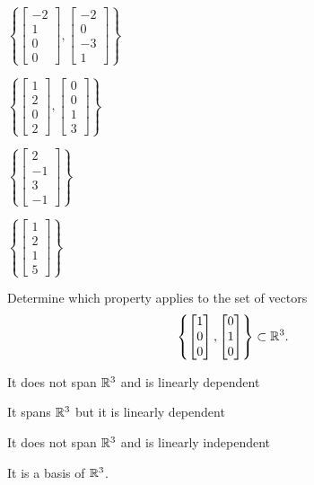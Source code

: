 \begin{readinessAssuranceTest}
\begin{multicols}{4}
\begin{readinessAssuranceTestChoices}
\item $\left\{ \begin{bmatrix} -2 \\ 1 \\ 0 \\ 0 \end{bmatrix}, \begin{bmatrix} -2 \\ 0 \\ -3 \\ 1 \end{bmatrix} \right\}$%
\item $\left\{ \begin{bmatrix} 1 \\ 2 \\ 0 \\ 2 \end{bmatrix}, \begin{bmatrix} 0 \\ 0 \\ 1 \\ 3 \end{bmatrix} \right\}$
\item $\left\{ \begin{bmatrix} 2 \\ -1 \\ 3 \\ -1 \end{bmatrix} \right\}$
\item $\left\{ \begin{bmatrix} 1 \\ 2 \\ 1 \\ 5 \end{bmatrix} \right\}$
\end{readinessAssuranceTestChoices}
\end{multicols}


\item Determine which property applies to the set of vectors $$\left\{ \begin{bmatrix}  1 \\ 0 \\ 0 \end{bmatrix}, \begin{bmatrix} 0 \\ 1 \\ 0 \end{bmatrix} \right\} \subset \mathbb{R}^3.$$
\begin{readinessAssuranceTestChoices}
\item It does not span \(\mathbb{R}^3\) and is linearly dependent
\item It spans \(\mathbb{R}^3\) but it is linearly dependent
\item It does not span \(\mathbb{R}^3\) and is linearly independent %
\item It is a basis of \(\mathbb{R}^3\).
\end{readinessAssuranceTestChoices}



\end{readinessAssuranceTest}
